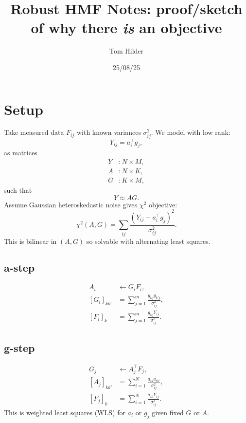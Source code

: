\documentclass[11pt]{article}
\title{Robust HMF Notes: proof/sketch of why there \emph{is} an objective}
\author{Tom Hilder}
\date{25/08/25}
\begin{document}
\maketitle

\section*{Setup}

Take measured data $F_{ij}$ with known variances $\sigma_{ij}^2$. 
We model with low rank:
\begin{equation}
    Y_{ij} = a_i^\top g_j,
\end{equation}
as matrices
\begin{align*}
    Y &: N \times M, \\
    A &: N \times K, \\
    G &: K \times M,
\end{align*}
such that
\begin{equation}
    Y \approx AG.
\end{equation}
Assume Gaussian heteroskedastic noise gives $\chi^2$ objective:
\begin{equation}
    \chi^2(A,G) = \sum_{ij} \frac{(Y_{ij} - a_i^\top g_j)^2}{\sigma_{ij}^2}.
\end{equation}
This is bilinear in $(A,G)$ so solvable with alternating least squares.

\subsection*{a-step}
\begin{align*}
    A_i &\leftarrow G_i F_i, \\
    [G_i]_{kk'} &= \sum_{j=1}^m \frac{g_{kj} g_{k'j}}{\sigma_{ij}^2}, \\
    [F_i]_k &= \sum_{j=1}^m \frac{g_{kj} Y_{ij}}{\sigma_{ij}^2}.
\end{align*}
\subsection*{g-step}
\begin{align*}
    G_j &\leftarrow A_j^\top F_j, \\
    [A_j]_{kk'} &= \sum_{i=1}^N \frac{a_{ik} a_{ik'}}{\sigma_{ij}^2}, \\
    [F_j]_k &= \sum_{i=1}^N \frac{a_{ik} Y_{ij}}{\sigma_{ij}^2}.
\end{align*}
This is weighted least squares (WLS) for $a_i$ or $g_j$ given fixed $G$ or $A$.
\end{document}
